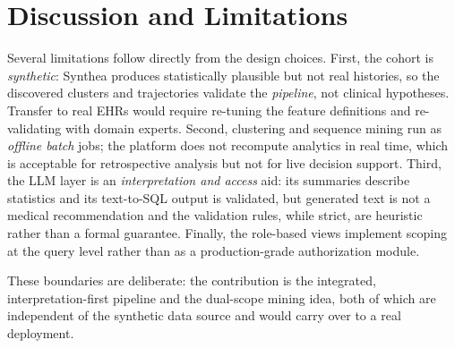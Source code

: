 \section{Discussion and Limitations}\label{sec:discussion}

Several limitations follow directly from the design choices. First, the cohort is
\emph{synthetic}: Synthea produces statistically plausible but not real
histories, so the discovered clusters and trajectories validate the
\emph{pipeline}, not clinical hypotheses. Transfer to real EHRs would require
re-tuning the feature definitions and re-validating with domain experts. Second,
clustering and sequence mining run as \emph{offline batch} jobs; the platform
does not recompute analytics in real time, which is acceptable for retrospective
analysis but not for live decision support. Third, the LLM layer is an
\emph{interpretation and access} aid: its summaries describe statistics and its
text-to-SQL output is validated, but generated text is not a medical
recommendation and the validation rules, while strict, are heuristic rather than
a formal guarantee. Finally, the role-based views implement scoping at the query
level rather than as a production-grade authorization module.

These boundaries are deliberate: the contribution is the integrated,
interpretation-first pipeline and the dual-scope mining idea, both of which are
independent of the synthetic data source and would carry over to a real
deployment.
